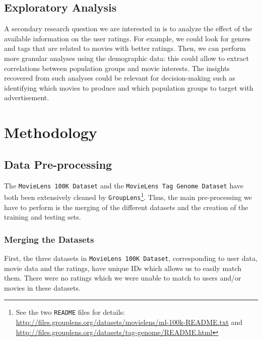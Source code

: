 \documentclass[bj, preprint]{imsart}
\begin{document}
\subsection{Exploratory Analysis}

A secondary research question we are interested in is to analyze the effect of the available information on the user ratings. For example, we could look for genres and tags that are related to movies with better ratings. Then, we can perform more granular analyses using the demographic data: this could allow to extract correlations between population groups and movie interests. The insights recovered from such analyses could be relevant for decision-making such as identifying which movies to produce and which population groups to target with advertisement.

\section{Methodology}\label{sec:method}

\subsection{Data Pre-processing}\label{subsec:method.preprocess}

The \texttt{MovieLens 100K Dataset} and the \texttt{MovieLens Tag Genome Dataset} have both been extensively cleaned by \texttt{GroupLens}\footnote{See the two \texttt{README} files for details: \url{http://files.grouplens.org/datasets/movielens/ml-100k-README.txt} and \url{http://files.grouplens.org/datasets/tag-genome/README.html}}. 
Thus, the main pre-processing we have to perform is the merging of the different datasets and the creation of the training and testing sets.

\subsubsection{Merging the Datasets}\label{subsubsec:method.preprocess.merge} 

First, the three datasets in \texttt{MovieLens 100K Dataset}, corresponding to user data, movie data and the ratings, have unique IDs which allows us to easily match them. 
There were no ratings which we were unable to match to users and/or movies in these datasets.
\end{document}
